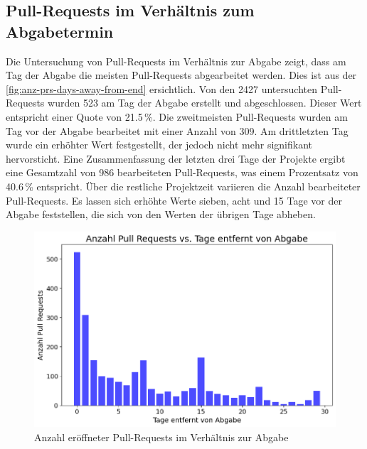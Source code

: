 \subsection{Pull-Requests im Verhältnis zum Abgabetermin}
Die Untersuchung von Pull-Requests im Verhältnis zur Abgabe zeigt, dass am Tag der Abgabe die meisten Pull-Requests abgearbeitet werden. Dies ist aus der \autoref{fig:anz-prs-days-away-from-end} ersichtlich. Von den 2427 untersuchten Pull-Requests wurden 523 am Tag der Abgabe erstellt und abgeschlossen. Dieser Wert entspricht einer Quote von 21.5\,\%.  Die zweitmeisten Pull-Requests wurden am Tag vor der Abgabe bearbeitet mit einer Anzahl von 309. Am drittletzten Tag wurde ein erhöhter Wert festgestellt, der jedoch nicht mehr signifikant hervorsticht. Eine Zusammenfassung der letzten drei Tage der Projekte ergibt eine Gesamtzahl von 986 bearbeiteten Pull-Requests, was einem Prozentsatz von 40.6\,\% entspricht. Über die restliche Projektzeit variieren die Anzahl bearbeiteter Pull-Requests. Es lassen sich erhöhte Werte sieben, acht und 15 Tage vor der Abgabe feststellen, die sich von den Werten der übrigen Tage abheben.
\begin{figure}[htbp]
    \includegraphics[width=\textwidth]{Figures/anz-prs-days-away-from-end.png}
    \caption{Anzahl eröffneter Pull-Requests im Verhältnis zur Abgabe}
    \label{fig:anz-prs-days-away-from-end}
\end{figure}

